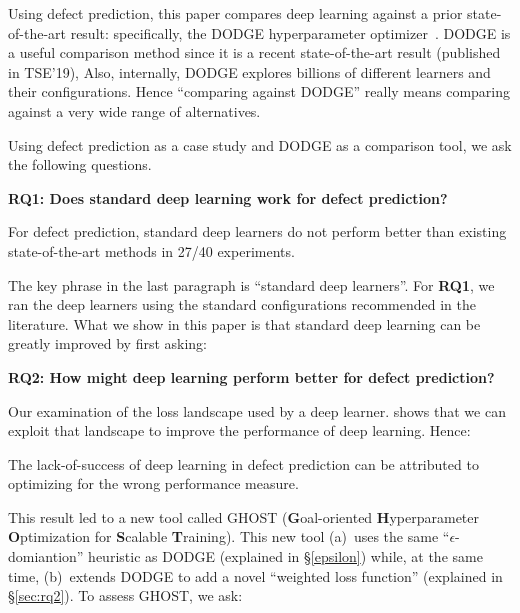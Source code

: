\documentclass[10pt,compsoc,twocolumn]{IEEEtran}
\newcommand{\ei}{\end{itemize}}
\begin{document}
Using defect prediction,
this paper compares deep learning against a prior state-of-the-art result: specifically, the
DODGE hyperparameter optimizer~\cite{agrawal2019dodge}.
DODGE is a useful comparison method since it is a recent state-of-the-art result (published in TSE'19), Also, internally,
DODGE explores billions of  different learners and their configurations. Hence ``comparing against DODGE'' really means comparing against a very wide range of alternatives. 

Using defect prediction as a case study and DODGE as a comparison tool, we ask the following questions.

\textbf{RQ1: Does standard deep learning work for defect prediction?}


\begin{blockquote}
    \noindent
    For defect prediction,
    standard deep learners do not perform better than existing state-of-the-art methods in 27/40 experiments. 
\end{blockquote}

The key phrase in the last paragraph is ``standard deep learners''. For {\bf RQ1}, we ran the deep learners using the  standard configurations recommended in the literature. What we show in this paper is that standard deep learning can be greatly improved by first asking:

\textbf{RQ2: How might deep learning perform better for defect prediction?}

Our  examination of  the loss landscape used  by a deep learner. 
shows that  we can exploit   
that landscape to   
improve the performance of deep learning. 
Hence:

\begin{blockquote}
    \noindent
   The lack-of-success of deep learning in defect prediction can be attributed to optimizing for the wrong performance measure.
\end{blockquote}
This result led to a new tool called GHOST (\textbf{G}oal-oriented \textbf{H}yperparameter \textbf{O}ptimization for \textbf{S}calable \textbf{T}raining). 
This new tool  (a)~uses the same \mbox{``$\epsilon$-domiantion''} heuristic as DODGE (explained in \S\ref{epsilon}) while, at the same time, (b)~extends DODGE to add a novel ``weighted loss function'' (explained in \S\ref{sec:rq2}).
To assess GHOST, we ask:
\end{document}
